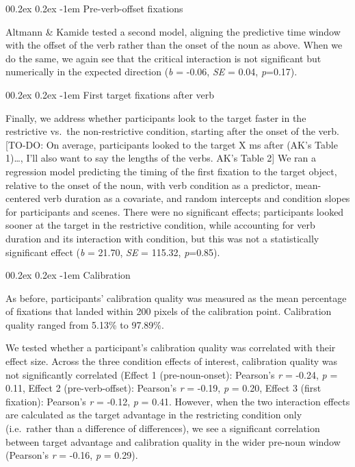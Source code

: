\documentclass[
  man,floatsintext]{apa6}
\makeatletter
\let\oldparagraph\paragraph
\renewcommand{\paragraph}[1]{\oldparagraph{#1}\mbox{}}
\renewcommand{\paragraph}{\@startsection{paragraph}{4}{\parindent}%
  {0\baselineskip \@plus 0.2ex \@minus 0.2ex}%
  {-1em}%
  {\normalfont\normalsize\bfseries\itshape\typesectitle}}
\makeatother
\begin{document}
\paragraph{Pre-verb-offset fixations}\label{pre-verb-offset-fixations-1}

Altmann \& Kamide tested a second model, aligning the predictive time window with the offset of the verb rather than the onset of the noun as above. When we do the same, we again see that the critical interaction is not significant but numerically in the expected direction (\emph{b} = -0.06, \emph{SE} = 0.04, \emph{p}=0.17).

\paragraph{First target fixations after verb}\label{first-target-fixations-after-verb-1}

Finally, we address whether participants look to the target faster in the restrictive vs.~the non-restrictive condition, starting after the onset of the verb. {[}TO-DO: On average, participants looked to the target X ms after (AK's Table 1)\ldots, I'll also want to say the lengths of the verbs. AK's Table 2{]} We ran a regression model predicting the timing of the first fixation to the target object, relative to the onset of the noun, with verb condition as a predictor, mean-centered verb duration as a covariate, and random intercepts and condition slopes for participants and scenes. There were no significant effects; participants looked sooner at the target in the restrictive condition, while accounting for verb duration and its interaction with condition, but this was not a statistically significant effect (\emph{b} = 21.70, \emph{SE} = 115.32, \emph{p}=0.85).

\paragraph{Calibration}\label{calibration-1}

As before, participants' calibration quality was measured as the mean percentage of fixations that landed within 200 pixels of the calibration point. Calibration quality ranged from 5.13\% to 97.89\%.

We tested whether a participant's calibration quality was correlated with their effect size. Across the three condition effects of interest, calibration quality was not significantly correlated (Effect 1 (pre-noun-onset): Pearson's \emph{r} = -0.24, \emph{p} = 0.11, Effect 2 (pre-verb-offset): Pearson's \emph{r} = -0.19, \emph{p} = 0.20, Effect 3 (first fixation): Pearson's \emph{r} = -0.12, \emph{p} = 0.41. However, when the two interaction effects are calculated as the target advantage in the restricting condition only (i.e.~rather than a difference of differences), we see a significant correlation between target advantage and calibration quality in the wider pre-noun window (Pearson's \emph{r} = -0.16, \emph{p} = 0.29).
\end{document}
